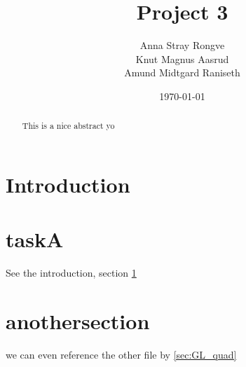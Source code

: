 \documentclass{article}
\title{Project 3}
\author{Anna Stray Rongve\\ Knut Magnus Aasrud\\ Amund Midtgard Raniseth}
\date{\today}
\begin{document}
\maketitle


\begin{abstract}
This is a nice abstract yo
\end{abstract}

\section{Introduction} \label{sec:intro} %

\section{taskA}
See the introduction, section \ref{sec:intro}



\section{anothersection}
we can even reference the other file by \ref{sec:GL_quad}
\end{document}
